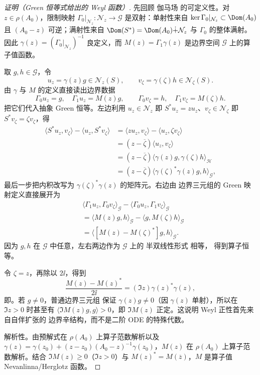 \begin{proof}[证明（Green 恒等式给出的 Weyl 函数）]
先回顾 伽马场 的可定义性。对 $z\in\rho(A_0)$，限制映射
$\Gamma_0|_{\mathcal N_z}:\mathcal N_z\to\mathcal G$ 是双射：单射性来自
$\ker\Gamma_0|_{\mathcal N_z}\subset\Dom(A_0)$ 且 $(A_0-z)$ 可逆；满射性来自
$\Dom(S^*)=\Dom(A_0)\dot+\mathcal N_z$ 与 $\Gamma_0$ 的整体满射。因此
$\gamma(z)=(\Gamma_0|_{\mathcal N_z})^{-1}$ 良定义，而
$M(z)=\Gamma_1\gamma(z)$ 是边界空间 $\mathcal G$ 上的算子值函数。

取 $g,h\in\mathcal G$，令
\[
 u_z=\gamma(z)g\in\mathcal N_z(S),
 \qquad
 v_\zeta=\gamma(\zeta)h\in\mathcal N_\zeta(S).
\]
由 $\gamma$ 与 $M$ 的定义直接读出边界数据
\[
 \Gamma_0u_z=g,
 \quad
 \Gamma_1u_z=M(z)g,
 \qquad
 \Gamma_0v_\zeta=h,
 \quad
 \Gamma_1v_\zeta=M(\zeta)h.
\]
把它们代入抽象 Green 恒等。左边利用
$u_z\in\mathcal N_z$ 即 $S^*u_z=zu_z$、$v_\zeta\in\mathcal N_\zeta$ 即
$S^*v_\zeta=\zeta v_\zeta$，得
\begin{align*}
 \langle S^*u_z,v_\zeta\rangle
 -\langle u_z,S^*v_\zeta\rangle
 &=\langle zu_z,v_\zeta\rangle-\langle u_z,\zeta v_\zeta\rangle\\
 &=(z-\overline\zeta)\langle u_z,v_\zeta\rangle\\
 &=(z-\overline\zeta)
 \langle\gamma(z)g,\gamma(\zeta)h\rangle_{\mathcal H}\\
 &=(z-\overline\zeta)
 \langle\gamma(\zeta)^*\gamma(z)g,h\rangle_{\mathcal G},
\end{align*}
最后一步把内积改写为 $\gamma(\zeta)^*\gamma(z)$ 的矩阵元。右边由 边界三元组的
Green 映射定义直接展开为
\begin{align*}
 &\langle\Gamma_1u_z,\Gamma_0v_\zeta\rangle_{\mathcal G}
 -\langle\Gamma_0u_z,\Gamma_1v_\zeta\rangle_{\mathcal G}\\
 &=\langle M(z)g,h\rangle_{\mathcal G}
 -\langle g,M(\zeta)h\rangle_{\mathcal G}\\
 &=\langle [M(z)-M(\zeta)^*]g,h\rangle_{\mathcal G}.
\end{align*}
因为 $g,h$ 在 $\mathcal G$ 中任意，左右两边作为 $\mathcal G$ 上的 半双线性形式 相等，
得到算子恒等。

令 $\zeta=z$，再除以 $2\ii$，得到
\[
 \frac{M(z)-M(z)^*}{2\ii}
 =(\Im z)\gamma(z)^*\gamma(z),
\]
即。若 $g\ne0$，普通边界三元组
保证 $\gamma(z)g\ne0$（因 $\gamma(z)$ 单射），所以在 $\Im z>0$ 时甚至有
$\langle\Im M(z)g,g\rangle>0$，即 $\Im M(z)$ 正定。这说明 Weyl 正性首先来自自伴扩张的
边界辛结构，而不是二阶 ODE 的特殊代数。

解析性。由预解式在 $\rho(A_0)$ 上算子范数解析以及
$\gamma(z)=\gamma(z_0)+(z-z_0)(A_0-z)^{-1}\gamma(z_0)$，$M(z)$ 在
$\rho(A_0)$ 上算子范数解析。结合 $\Im M(z)\ge0$（$\Im z>0$）与
$M(z)^*=M(\overline z)$，$M$ 是算子值 Nevanlinna/Herglotz 函数。
\end{proof}

